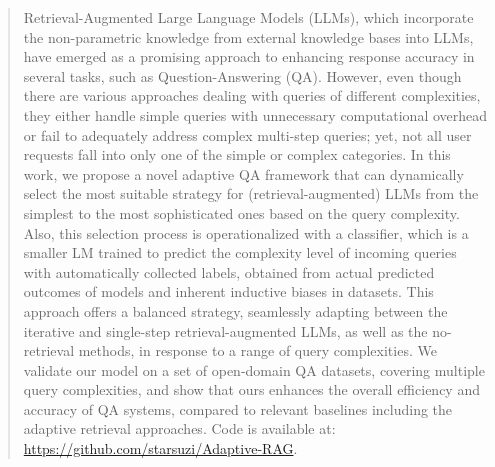\begin{abstract}

Retrieval-Augmented Large Language Models (LLMs), which incorporate the non-parametric knowledge from external knowledge bases into LLMs, have emerged as a promising approach to enhancing response accuracy in several tasks, such as Question-Answering (QA). However, even though there are various approaches dealing with queries of different complexities, they either handle simple queries with unnecessary computational overhead or fail to adequately address complex multi-step queries; yet, not all user requests fall into only one of the simple or complex categories. In this work, we propose a novel adaptive QA framework that can dynamically select the most suitable strategy for (retrieval-augmented) LLMs from the simplest to the most sophisticated ones based on the query complexity. Also, this selection process is operationalized with a classifier, which is a smaller LM trained to predict the complexity level of incoming queries with automatically collected labels, obtained from actual predicted outcomes of models and inherent inductive biases in datasets. This approach offers a balanced strategy, seamlessly adapting between the iterative and single-step retrieval-augmented LLMs, as well as the no-retrieval methods, in response to a range of query complexities. We validate our model on a set of open-domain QA datasets, covering multiple query complexities, and show that ours enhances the overall efficiency and accuracy of QA systems, compared to relevant baselines including the adaptive retrieval approaches. Code is available at: \url{https://github.com/starsuzi/Adaptive-RAG}.

\end{abstract}